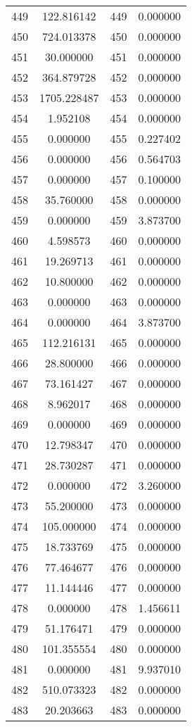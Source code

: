 \documentclass[12pt]{article}
\begin{document}
\begin{longtable}{@{}cccc@{}}
449 & 122.816142 & 449 & 0.000000 \\
450 & 724.013378 & 450 & 0.000000 \\
451 & 30.000000 & 451 & 0.000000 \\
452 & 364.879728 & 452 & 0.000000 \\
453 & 1705.228487 & 453 & 0.000000 \\
454 & 1.952108 & 454 & 0.000000 \\
455 & 0.000000 & 455 & 0.227402 \\
456 & 0.000000 & 456 & 0.564703 \\
457 & 0.000000 & 457 & 0.100000 \\
458 & 35.760000 & 458 & 0.000000 \\
459 & 0.000000 & 459 & 3.873700 \\
460 & 4.598573 & 460 & 0.000000 \\
461 & 19.269713 & 461 & 0.000000 \\
462 & 10.800000 & 462 & 0.000000 \\
463 & 0.000000 & 463 & 0.000000 \\
464 & 0.000000 & 464 & 3.873700 \\
465 & 112.216131 & 465 & 0.000000 \\
466 & 28.800000 & 466 & 0.000000 \\
467 & 73.161427 & 467 & 0.000000 \\
468 & 8.962017 & 468 & 0.000000 \\
469 & 0.000000 & 469 & 0.000000 \\
470 & 12.798347 & 470 & 0.000000 \\
471 & 28.730287 & 471 & 0.000000 \\
472 & 0.000000 & 472 & 3.260000 \\
473 & 55.200000 & 473 & 0.000000 \\
474 & 105.000000 & 474 & 0.000000 \\
475 & 18.733769 & 475 & 0.000000 \\
476 & 77.464677 & 476 & 0.000000 \\
477 & 11.144446 & 477 & 0.000000 \\
478 & 0.000000 & 478 & 1.456611 \\
479 & 51.176471 & 479 & 0.000000 \\
480 & 101.355554 & 480 & 0.000000 \\
481 & 0.000000 & 481 & 9.937010 \\
482 & 510.073323 & 482 & 0.000000 \\
483 & 20.203663 & 483 & 0.000000 \\

\end{longtable}
\end{document}

